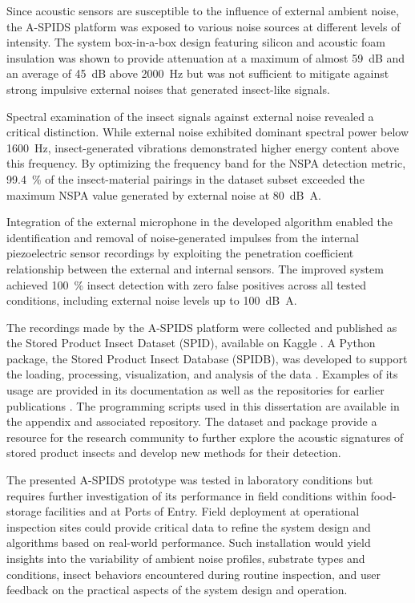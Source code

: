 \documentclass[../Vibro-Acoustic Signatures and Detection Algorithms for Stored Product Insects.tex]{subfiles}
\begin{document}
Since acoustic sensors are susceptible to the influence of external ambient noise, the A-SPIDS platform was exposed to various noise sources at different levels of intensity. The system box-in-a-box design featuring silicon and acoustic foam insulation was shown to provide attenuation at a maximum of almost \SI{59}{\deci\bel} and an average of \SI{45}{\deci\bel} above \SI{2000}{\hertz} but was not sufficient to mitigate against strong impulsive external noises that generated insect-like signals. 

Spectral examination of the insect signals against external noise revealed a critical distinction. While external noise exhibited dominant spectral power below \SI{1600}{\hertz}, insect-generated vibrations demonstrated higher energy content above this frequency. By optimizing the frequency band for the NSPA detection metric, \SI{99.4}{\percent} of the insect-material pairings in the dataset subset exceeded the maximum NSPA value generated by external noise at \SI{80}{\deci\bel A}. 

Integration of the external microphone in the developed algorithm enabled the identification and removal of noise-generated impulses from the internal piezoelectric sensor recordings by exploiting the penetration coefficient relationship between the external and internal sensors. The improved system achieved \SI{100}{\percent} insect detection with zero false positives across all tested conditions, including external noise levels up to \SI{100}{\deci\bel A}.

The recordings made by the A-SPIDS platform were collected and published as the Stored Product Insect Dataset (SPID), available on Kaggle \cite{danielkadyrovStoredProductInsecta}. A Python package, the Stored Product Insect Database (SPIDB), was developed to support the loading, processing, visualization, and analysis of the data \cite{danielkadyrovDkadyrovSpidbSPIDB2024}. Examples of its usage are provided in its documentation as well as the repositories for earlier publications \cite{danielkadyrovDkadyrovSPIDAcousticV100a2026}. The programming scripts used in this dissertation are available in the appendix and associated repository. The dataset and package provide a resource for the research community to further explore the acoustic signatures of stored product insects and develop new methods for their detection. 

The presented A-SPIDS prototype was tested in laboratory conditions but requires further investigation of its performance in field conditions within food-storage facilities and at Ports of Entry. Field deployment at operational inspection sites could provide critical data to refine the system design and algorithms based on real-world performance. Such installation would yield insights into the variability of ambient noise profiles, substrate types and conditions, insect behaviors encountered during routine inspection, and user feedback on the practical aspects of the system design and operation. 
\end{document}
